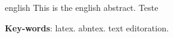 \begin{resumo}[Abstract]
 \begin{otherlanguage*}{english}
   This is the english abstract.
   Teste

   \vspace{\onelineskip}
 
   \noindent 
   \textbf{Key-words}: latex. abntex. text editoration.
 \end{otherlanguage*}
\end{resumo}
